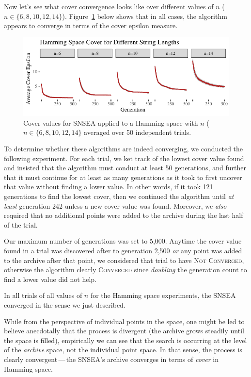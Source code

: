 \documentclass[twoside]{article}
\begin{document}
Now let's see what cover convergence looks like over different values of $n$ ($n\in\{6, 8, 10, 12, 14\}$).  Figure~\ref{fig:hamming:nopop:sm} below shows that in all cases, the algorithm appears to converge in terms of the cover epsilon measure.
%
\begin{figure}[t]
  \center\includegraphics[width=1\textwidth]{Figures/hamming-500sm-NOPOP.pdf}
  \caption{\label{fig:hamming:nopop:sm} Cover values for SNSEA applied to a Hamming space with $n$ ($n\in\{6, 8, 10, 12, 14\}$ averaged over 50 independent trials.}
\end{figure}
%

To determine whether these algorithms are indeed converging, we conducted the following experiment.  For each trial, we ket track of the lowest cover value found and insisted that the algorithm must conduct at least 50 generations, and further that it must continue for at least as many generations as it took to first uncover that value without finding a lower value.  In other words, if it took 121 generations to find the lowest cover, then we continued the algorithm until \emph{at least} generation 242 unless a new cover value was found.  Moreover, we \emph{also} required that no additional points were added to the archive during the last half of the trial.

Our maximum number of generations was set to 5,000.  Anytime the cover value found in a trial was discovered after to generation 2,500 \emph{or} any point was added to the archive after that point, we considered that trial to have \textsc{Not Converged}, otherwise the algorithm clearly \textsc{Converged} since \emph{doubling} the generation count to find a lower value did not help.  

In all trials of all values of $n$  for the Hamming space experiments, the SNSEA converged in the sense we just described.

While from the perspective of individual points in the space, one might be led to believe anecdotally that the process is divergent (the archive grows steadily until the space is filled), empirically we can see that the search is occurring at the level of the \emph{archive} space, not the individual point space.  In that sense, the process is clearly convergent\,---\,the SNSEA's archive converges in terms of \emph{cover} in Hamming space.
\end{document}
